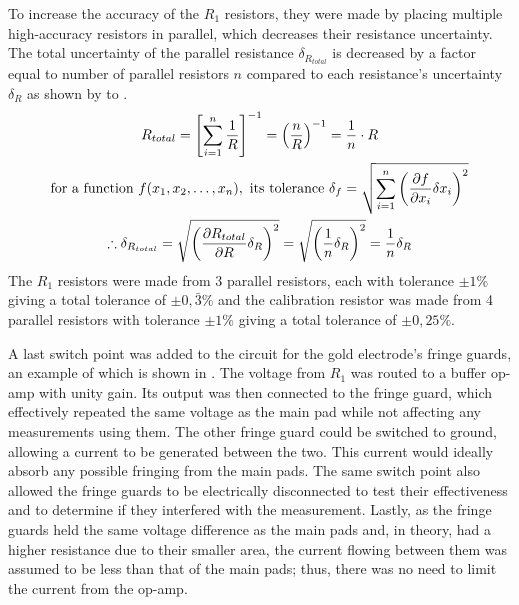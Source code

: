 To increase the accuracy of the $R_1$ resistors, they were made by placing multiple high-accuracy resistors in parallel, which decreases their resistance uncertainty.
The total uncertainty of the parallel resistance $\delta_{R_{total}}$ is decreased by a factor equal to number of parallel resistors $n$ compared to each resistance's uncertainty $\delta_R$ as shown by  to .
\begin{gather}
 R_{total} = {\left[ \sum_{i=1}^{n} \frac{\displaystyle1}{\displaystyle R} \right]}^{-1} = {\left(\frac{\displaystyle n}{\displaystyle R}\right)}^{-1} = \frac{\displaystyle1}{\displaystyle n}\cdot R \label{eqn:parallel-resistor-total} \\
 \text{for a function}~f(x_1,x_2,\dots,x_n),~\text{its tolerance} ~\delta_f = \sqrt{\sum_{i=1}^{n} {\left( \frac{\displaystyle\partial f}{\displaystyle\partial x_i} \delta x_i \right)}^2} \label{eqn:uncertainty-general-formula} \\
    \therefore \delta_{R_{total}} = \sqrt{{\left( \frac{\displaystyle\partial R_{total}}{\displaystyle\partial R} \delta_R \right)}^2} = \sqrt{{\left( \frac{\displaystyle1}{\displaystyle n} \delta_R \right)}^2} = \frac{\displaystyle1}{\displaystyle n} \delta_R \label{eqn:parallel-resistor-uncertainty}
\end{gather}
The $R_1$ resistors were made from 3 parallel resistors, each with tolerance $\pm1\%$ giving a total tolerance of $\pm0,\bar{3}\%$ and the calibration resistor was made from 4 parallel resistors with tolerance $\pm1\%$ giving a total tolerance of $\pm0,25\%$.

A last switch point was added to the circuit for the gold electrode's fringe guards, an example of which is shown in .
The voltage from $R_1$ was routed to a buffer op-amp with unity gain. 
Its output was then connected to the fringe guard, which effectively repeated the same voltage as the main pad while not affecting any measurements using them.
The other fringe guard could be switched to ground, allowing a current to be generated between the two. 
This current would ideally absorb any possible fringing from the main pads.
The same switch point also allowed the fringe guards to be electrically disconnected to test their effectiveness and to determine if they interfered with the measurement.
Lastly, as the fringe guards held the same voltage difference as the main pads and, in theory, had a higher resistance due to their smaller area, the current flowing between them was assumed to be less than that of the main pads; thus, there was no need to limit the current from the op-amp.

